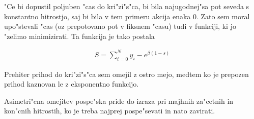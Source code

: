 \documentclass[a4paper,10pt]{article}
\begin{document}
"Ce bi dopustil poljuben "cas do kri"zi"s"ca, bi bila najugodnej"sa pot seveda s konstantno hitrostjo, saj bi bila v tem primeru akcija enaka 0. Zato sem moral upo"stevali "cas (oz prepotovano pot v fiksnem "casu) tudi v funkciji, ki jo "zelimo minimizirati. Ta funkcija je tako postala

\begin{align}
 S = \sum_{i=0}^{N} y_i - e^{\beta (1-s)}
\end{align}

Prehiter prihod do kri"zi"s"ca sem omejil z ostro mejo, medtem ko je prepozen prihod kaznovan le z eksponentno funkcijo. 



Asimetri"cna omejitev pospe"ska pride do izraza pri majhnih za"cetnih in kon"cnih hitrostih, ko je treba najprej pospe"sevati in nato zavirati. 
\end{document}
